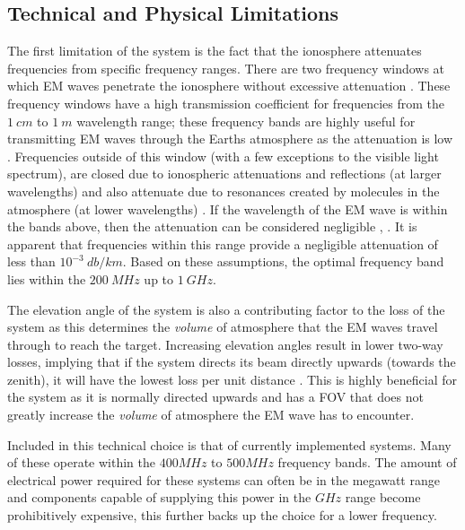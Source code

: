 \documentclass[11pt]{witseiepaper}
\begin{document}
\subsection{Technical and Physical Limitations} \label{sec:TechnicalandPhysicalLimitations}
The first limitation of the system is the fact that the ionosphere attenuates frequencies from specific frequency ranges. There are two frequency windows at which EM waves penetrate the ionosphere without excessive attenuation \cite{ObjectInformation}.
These frequency windows have a high transmission coefficient for frequencies from the $1~cm$ to $1~m$ wavelength range; these frequency bands are highly useful for transmitting EM waves through the Earths atmosphere as the attenuation is low \cite{frequencyAttenuation}. Frequencies outside of this window (with a few exceptions to the visible light spectrum), are closed due to ionospheric attenuations and reflections (at larger wavelengths) and also attenuate due to resonances created by molecules in the atmosphere (at lower wavelengths) \cite{frequencyAttenuation}.  
If the wavelength of the EM wave is within the bands above, then the attenuation can be considered negligible \cite{ionosphereAttenuationStandard}, \cite[p.~15,124]{radarHandbook}. It is apparent that frequencies within this range provide a negligible attenuation of less than $10^{-3}~db/km$.
Based on these assumptions, the optimal frequency band lies within the $200~MHz$ up to $1~GHz$. %

The elevation angle of the system is also a contributing factor to the loss of the system as this determines the \textit{volume} of atmosphere that the EM waves travel through to reach the target. Increasing elevation angles result in lower two-way losses, implying that if the system directs its beam directly upwards (towards the zenith), it will have the lowest loss per unit distance \cite[p.~70]{elevationLoss}. This is highly beneficial for the system as it is normally directed upwards and has a FOV that does not greatly increase the \textit{volume} of atmosphere the EM wave has to encounter.


Included in this technical choice is that of currently implemented systems. Many of these operate within the $400 MHz$ to $500 MHz$ frequency bands.
The amount of electrical power required for these systems can often be in the megawatt range and components capable of supplying this power in the $GHz$ range become prohibitively expensive, this further backs up the choice for a lower frequency.
\end{document}
